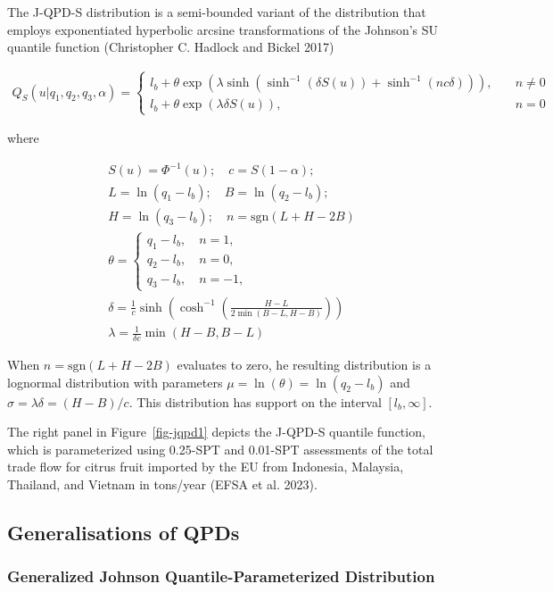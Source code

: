 \documentclass[
]{interact}
\begin{document}
The J-QPD-S distribution is a semi-bounded variant of the distribution
that employs exponentiated hyperbolic arcsine transformations of the
Johnson's SU quantile function (Christopher C. Hadlock and Bickel 2017)

\[
\begin{gathered}
Q_S(u\vert q_1, q_2, q_3, \alpha)=\begin{cases}
l_b+\theta\exp\left(\lambda\sinh\left(\sinh^{-1}(\delta S(u))+\sinh^{-1}(nc\delta)\right)\right), \quad &n \neq 0\\
l_b+\theta\exp\left(\lambda\delta S(u)\right), \quad &n=0
\end{cases}
\end{gathered}
\]

where

\[
\begin{gathered}
S(u)=\Phi^{-1}(u); \quad c=S(1-\alpha);\\
L=\ln(q_1-l_b); \quad  B=\ln(q_2-l_b);\\
H=\ln(q_3-l_b); \quad n=\text{sgn}(L+H-2B)\\
\theta=\begin{cases}
q_1-l_b, \quad n=1,\\
q_2-l_b, \quad n=0,\\
q_3-l_b, \quad n=-1,\end{cases}\\
\delta=\frac{1}{c}\sinh\left(\cosh^{-1}\left(\frac{H-L}{2\min(B-L,H-B)}\right)\right)\\
\lambda=\frac{1}{\delta c}\min(H-B, B-L)
\end{gathered}
\]

When \(n=\text{sgn}(L+H-2B)\) evaluates to zero, he resulting
distribution is a lognormal distribution with parameters
\(\mu=\ln(\theta)=\ln(q_2-l_b)\) and \(\sigma=\lambda\delta=(H-B)/c\).
This distribution has support on the interval \([l_b,\infty]\).

The right panel in Figure~\ref{fig-jqpd1} depicts the J-QPD-S quantile
function, which is parameterized using 0.25-SPT and 0.01-SPT assessments
of the total trade flow for citrus fruit imported by the EU from
Indonesia, Malaysia, Thailand, and Vietnam in tons/year (EFSA et al.
2023).

\subsection{Generalisations of QPDs}\label{generalisations-of-qpds}

\subsubsection{Generalized Johnson Quantile-Parameterized
Distribution}\label{generalized-johnson-quantile-parameterized-distribution}
\end{document}
